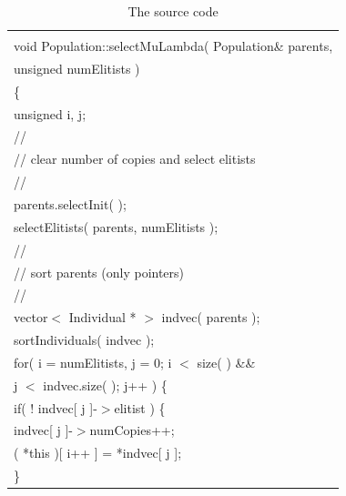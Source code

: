 \documentclass[twocolumn]{article}
\begin{document}
\begin{table}[h]
\begin{center}
\caption{The source code}
\label{SC3}
{\scriptsize
\begin{tabular}{|l|}\hline
\hspace*{7cm}\\
void Population::selectMuLambda( Population\& parents, \\
\hspace*{4mm} unsigned numElitists )\\
\{\\
\hspace*{4mm} unsigned i, j;\\
\hspace*{4mm} //\\
\hspace*{4mm} // clear number of copies and select elitists\\
\hspace*{4mm} //\\
\hspace*{4mm} parents.selectInit( );\\
\hspace*{4mm} selectElitists( parents, numElitists );\\
\hspace*{4mm} //\\
\hspace*{4mm} // sort parents (only pointers)\\
\hspace*{4mm} //\\
\hspace*{4mm} vector$<$ Individual * $>$ indvec( parents );\\
\hspace*{4mm} sortIndividuals( indvec );\\
\hspace*{4mm} for( i = numElitists, j = 0; i $<$ size( ) \&\& \\
\hspace*{8mm} j $<$ indvec.size( ); j++ ) \{\\
\hspace*{8mm} if( $!$ indvec[ j ]-$>$elitist ) \{\\
\hspace*{12mm} indvec[ j ]-$>$numCopies++;\\
\hspace*{12mm} ( *this )[ i++ ] = *indvec[ j ];\\
\hspace*{8mm} \}\\

\end{tabular}}
\end{center}
\end{table}
\end{document}
